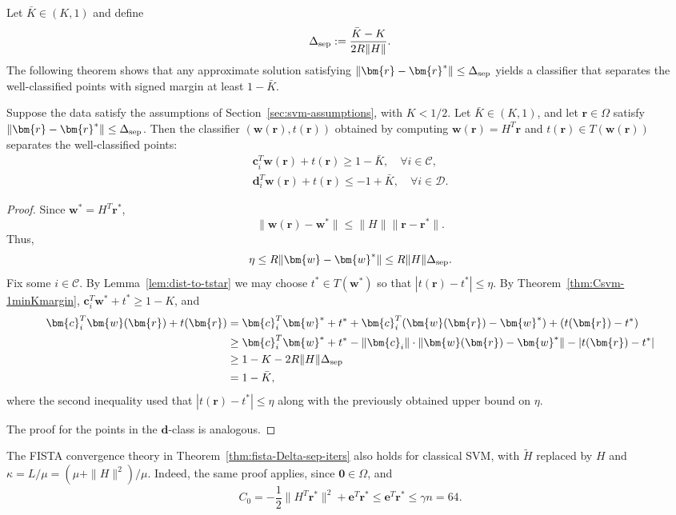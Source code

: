 \documentclass[twoside,11pt]{article}
\newcommand\bz{\bm{0}}
\renewcommand{\c}{\bm{c}}
\renewcommand{\d}{\bm{d}}
\renewcommand\r{\bm{r}}
\newcommand\w{\bm{w}}
\newcommand\e{\bm{e}}
\newcommand\CC{\mathcal{C}}
\newcommand\DD{\mathcal{D}}
\newcommand\tH{\tilde{H}}
\begin{document}
Let $\bar{K} \in (K,1)$ and define
\[
    \Delta_{\rm sep} := \frac{\bar{K} - K}{2R\|H\|}.
\]
The following theorem shows that any approximate solution satisfying $\|\r - \r^*\| \leq \Delta_{\rm sep}$ yields a classifier that separates the well-classified points with signed margin at least $1-\bar{K}$.
\begin{theorem} \label{thm:Csvm-separation-theorem}
    Suppose the data satisfy the assumptions of Section~\ref{sec:svm-assumptions}, with $K<1/2$. Let $\bar{K} \in (K,1)$, and let $\r \in \Omega$ satisfy $\|\r - \r^*\| \leq \Delta_{\rm sep}$. Then the classifier $(\w(\r), t(\r))$ obtained by computing $\w(\r) = H^T\r$ and $t(\r) \in T(\w(\r))$ separates the well-classified points:
    \begin{align*}
        \c_i^T\w(\r) + t(\r) \geq 1 - \bar{K},\quad\forall i \in \CC,\\
        \d_i^T\w(\r) + t(\r) \leq -1 + \bar{K},\quad\forall i \in \DD.
  \end{align*}
\end{theorem}
\begin{proof}
    Since $\w^* = H^T\r^*$,
    \[
        \|\w(\r) - \w^*\| \leq \|H\|\|\r - \r^*\|.
    \]
    Thus,
    \[
        \eta \leq R\|\w - \w^*\| \leq R\|H\|\Delta_{\rm sep}.
    \]
    Fix some $i \in \CC$. By Lemma~\ref{lem:dist-to-tstar} we may choose $t^* \in T(\w^*)$ so that $|t(\r) - t^*| \leq \eta$. By Theorem~\ref{thm:Csvm-1minKmargin}, $\c_i^T\w^* + t^* \geq 1 - K$, and
    \begin{align*}
        \c_i^T\w(\r) + t(\r) &= \c_i^T\w^* + t^* + \c_i^T(\w(\r) - \w^*) + (t(\r) - t^*)\\
                             &\geq \c_i^T\w^* + t^* - \|\c_i\|\cdot \|\w(\r) - \w^*\| - |t(\r) - t^*|\\
                             &\geq 1 - K - 2R\|H\|\Delta_{\rm sep}\\
                             &= 1 - \bar{K},
    \end{align*}
    where the second inequality used that $|t(\r) - t^*| \leq \eta$ along with the previously obtained upper bound on $\eta$.
    
    The proof for the points in the $\d$-class is analogous.
\end{proof}

The FISTA convergence theory in Theorem~\ref{thm:fista-Delta-sep-iters} also holds for classical SVM, with $\tH$ replaced by $H$ and $\kappa = L/\mu = (\mu+\|H\|^2)/\mu$. Indeed, the same proof applies, since $\bz \in \Omega$, and
\[
    C_0 = -\frac{1}{2}\|H^T\r^*\|^2 + \e^T\r^* \leq \e^T\r^* \leq \gamma n = 64.
\]
\end{document}
